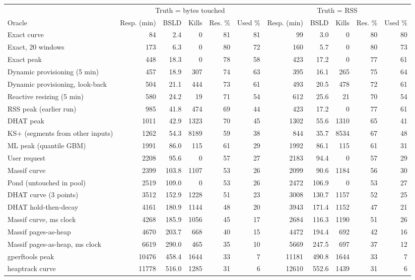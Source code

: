 \begin{tabular}{lrrrrrrrrrr}
\toprule
 & \multicolumn{5}{c}{Truth = bytes touched} & \multicolumn{5}{c}{Truth = RSS} \\
\cmidrule(lr){2-6} \cmidrule(lr){7-11}
Oracle & Resp. (min) & BSLD & Kills & Res. \% & Used \% & Resp. (min) & BSLD & Kills & Res. \% & Used \% \\
\midrule
Exact curve & 84 & 2.4 & 0 & 81 & 81 & 99 & 3.0 & 0 & 80 & 80 \\
Exact, 20 windows & 173 & 6.3 & 0 & 80 & 72 & 160 & 5.7 & 0 & 80 & 73 \\
Exact peak & 448 & 18.3 & 0 & 78 & 58 & 423 & 17.2 & 0 & 77 & 61 \\
Dynamic provisioning (5 min) & 457 & 18.9 & 307 & 74 & 63 & 395 & 16.1 & 265 & 75 & 64 \\
Dynamic provisioning, look-back & 504 & 21.1 & 444 & 73 & 61 & 493 & 20.5 & 478 & 72 & 61 \\
Reactive resizing (5 min) & 580 & 24.2 & 19 & 71 & 54 & 612 & 25.6 & 21 & 70 & 54 \\
RSS peak (earlier run) & 985 & 41.8 & 474 & 69 & 44 & 423 & 17.2 & 0 & 77 & 61 \\
DHAT peak & 1011 & 42.9 & 1323 & 70 & 45 & 1302 & 55.6 & 1310 & 65 & 41 \\
KS+ (segments from other inputs) & 1262 & 54.3 & 8189 & 59 & 38 & 844 & 35.7 & 8534 & 67 & 48 \\
ML peak (quantile GBM) & 1991 & 86.0 & 115 & 61 & 29 & 1992 & 86.1 & 115 & 61 & 31 \\
User request & 2208 & 95.6 & 0 & 57 & 27 & 2183 & 94.4 & 0 & 57 & 29 \\
Massif curve & 2399 & 103.8 & 1107 & 53 & 26 & 2099 & 90.6 & 1184 & 56 & 30 \\
Pond (untouched in pool) & 2519 & 109.0 & 0 & 53 & 26 & 2472 & 106.9 & 0 & 53 & 27 \\
DHAT curve (3 points) & 3512 & 152.9 & 1228 & 51 & 23 & 3008 & 130.7 & 1157 & 52 & 25 \\
DHAT hold-then-decay & 4161 & 180.9 & 1144 & 48 & 20 & 3943 & 171.4 & 1152 & 47 & 21 \\
Massif curve, ms clock & 4268 & 185.9 & 1056 & 45 & 17 & 2684 & 116.3 & 1190 & 51 & 26 \\
Massif pages-as-heap & 4670 & 203.7 & 668 & 40 & 15 & 4472 & 194.4 & 692 & 42 & 16 \\
Massif pages-as-heap, ms clock & 6619 & 290.0 & 465 & 35 & 10 & 5669 & 247.5 & 697 & 37 & 12 \\
gperftools peak & 10476 & 458.4 & 1644 & 33 & 7 & 11181 & 490.8 & 1644 & 33 & 7 \\
heaptrack curve & 11778 & 516.0 & 1285 & 31 & 6 & 12610 & 552.6 & 1439 & 31 & 6 \\
\bottomrule
\end{tabular}

